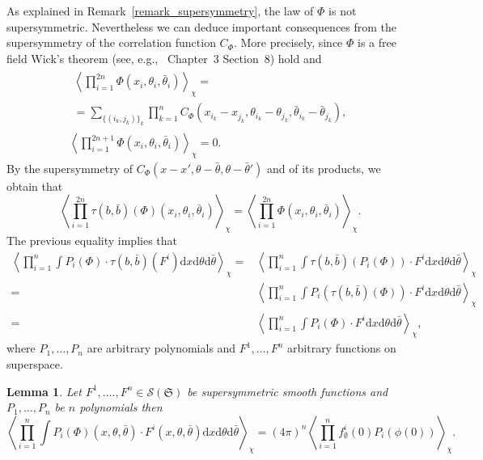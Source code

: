 \documentclass[a4paper,10pt]{article}
\newcommand{\mathd}{\mathrm{d}}
\newtheorem{lemma}[theorem]{Lemma}
\begin{document}
As explained in Remark~\ref{remark_supersymmetry}, the law of $\Phi$ is not
supersymmetric. Nevertheless we can deduce important consequences from the
supersymmetry of the correlation function $C_{\Phi}$. More precisely, since
$\Phi$ is a free field Wick's theorem (see, e.g.,~{\cite{Fetter2012}}
Chapter~3 Section~8) hold and
\begin{eqnarray}
  & \begin{array}{c}
    \left\langle \prod_{i = 1}^{2 n} \Phi (x_i, \theta_i, \bar{\theta}_i)
    \right\rangle_{\chi} =\\
    = \sum_{\{ (i_k, j_k) \} _k} \prod_{k = 1}^n C_{\Phi} (x_{i_k} -
    x_{j_k}^{}, \theta_{i_k} - \theta_{j_k}, \bar{\theta}_{i_k} -
    \bar{\theta}_{j_k}),
  \end{array} &  \label{equationsupersymmetry3}\\
  & \left\langle \prod_{i = 1}^{2 n + 1} \Phi (x_i, \theta_i, \bar{\theta}_i)
  \right\rangle_{\chi} = 0. & 
\end{eqnarray}
By the supersymmetry of $C_{\Phi} (x - x', \theta - \bar{\theta}, \theta -
\bar{\theta}')$ and of its products, we obtain that
\[ \left\langle \prod_{i = 1}^{2 n} \tau (b, \bar{b}) (\Phi) (x_i, \theta_i,
   \bar{\theta}_i) \right\rangle_{\chi} = \left\langle \prod_{i = 1}^{2 n}
   \Phi (x_i, \theta_i, \bar{\theta}_i) \right\rangle_{\chi} . \]
The previous equality implies that
\begin{equation}
  \begin{aligned}
    \left\langle \prod_{i = 1}^n \int P_i (\Phi) \cdot \tau (b, \bar{b}) (F^i)
    \mathd x \mathd \theta \mathd \bar{\theta} \right\rangle_{\chi} = &
    \left\langle \prod_{i = 1}^n \int \tau (b, \bar{b}) (P_i (\Phi)) \cdot F^i
    \mathd x \mathd \theta \mathd \bar{\theta} \right\rangle_{\chi}\\
    = & \left\langle \prod_{i = 1}^n \int P_i (\tau (b, \bar{b}) (\Phi)) \cdot
    F^i \mathd x \mathd \theta \mathd \bar{\theta} \right\rangle_{\chi}\\
    = & \left\langle \prod_{i = 1}^n \int P_i (\Phi) \cdot F^i \mathd x \mathd
    \theta \mathd \bar{\theta} \right\rangle_{\chi},
  \end{aligned}
  \label{equationsupersymmetry5}
\end{equation}
where $P_1, \ldots, P_n$ are arbitrary polynomials and $F^1, \ldots, F^n$
arbitrary functions on superspace.

\begin{lemma}
  \label{lemma_supersymmetry1}Let $F^1, \ldots ., F^n \in \mathcal{S}
  (\mathfrak{S})$ be supersymmetric smooth functions and $P_1, \ldots, P_n$ be
  $n$ polynomials then
  \[ \left\langle \prod^n_{i = 1} \int P_i (\Phi) (x, \theta, \bar{\theta})
     \cdot F^i (x, \theta, \bar{\theta}) \mathd x \mathd \theta \mathd
     \bar{\theta} \right\rangle_{\chi} = (4 \pi)^n \left\langle \prod_{i =
     1}^n f^i_{\emptyset} (0) P_i (\phi (0)) \right\rangle_{\chi} . \]
\end{lemma}
\end{document}
